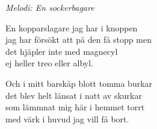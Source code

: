 {\footnotesize\textit{Melodi: En sockerbagare}}\par
\vspace{10pt}
En kopparslagare jag har i knoppen\\
jag har försökt att på den få stopp men\\
det hjäpler inte med magnecyl\\
ej heller treo eller albyl.\par
\vspace{10pt}
Och i mitt barskåp blott tomma burkar\\
det blev helt länsat i natt av skurkar\\
som lämmnat mig här i hemmet torrt\\
med värk i huvud jag vill få bort.
